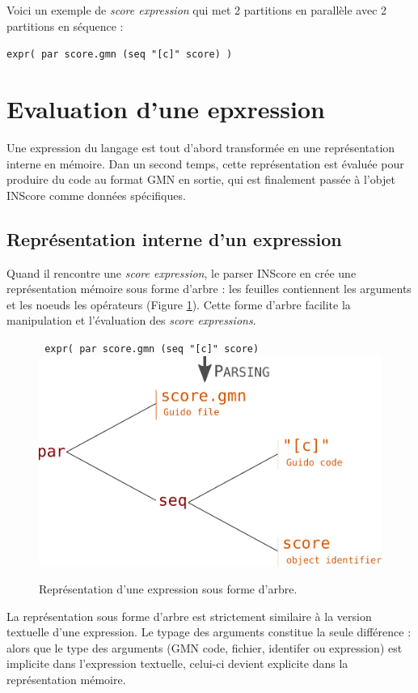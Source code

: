\documentclass{article}
\newcommand{\OSC}[1]{\texttt{#1}}
\newcommand{\oper}[1]{\textcolor{figRed}{#1}}
\newcommand{\param}[1]{\textcolor{figOrange}{#1}}
\newcommand{\sExpr}{\emph{score expression}}
\newcommand{\sExprs}{\emph{score expressions}}
\newcommand{\sample}	[1]			{\vspace{-0.2em}\begin{center}\colorbox{mygrey}{\begin{minipage}[t]{0.97\columnwidth} {\small \texttt{#1}}\end{minipage}}\end{center}}
\begin{document}
Voici un exemple de \emph{score expression} qui met 2 partitions en parallèle avec 2 partitions en séquence :
\sample{expr( par score.gmn (seq "[c]" score) )}

\section{Evaluation d'une epxression}
\label{evaluationSpec}
Une expression du langage est tout d'abord transformée en une représentation interne en mémoire. Dan un second temps, cette représentation est évaluée pour produire du code au format GMN en sortie, qui est finalement passée à l'objet INScore comme données spécifiques.

\subsection{Représentation interne d'un expression}

Quand il rencontre une  \sExpr, le parser INScore en crée une représentation mémoire sous forme d'arbre : les feuilles contiennent les arguments et les noeuds les opérateurs (Figure \ref{fig:parsing}). Cette forme d'arbre facilite la manipulation et l'évaluation des \sExprs.

\begin{figure}[th]
\centering
\OSC{ expr( \oper{par} \param{score.gmn}  (\oper{seq} \param{"[c]" score})}
\includegraphics[width=0.8\columnwidth]{imgs/exprParse}
\caption{Représentation d'une expression sous forme d'arbre.
\label{fig:parsing}}
\end{figure}

La représentation sous forme d'arbre est strictement similaire à la version textuelle d'une expression. Le typage des arguments constitue la seule différence : alors que le type des arguments (GMN code, fichier, identifer ou expression) est implicite dans l'expression textuelle, celui-ci devient explicite dans la représentation mémoire. 
\end{document}
